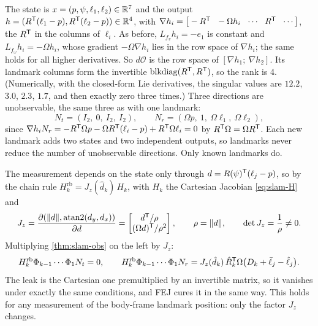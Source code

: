 \begin{solutions}
  \item The state is $x = (p, \psi, \ell_1, \ell_2) \in \mathbb{R}^7$ and the output $h = (R^{\mathsf{T}}(\ell_1 - p), R^{\mathsf{T}}(\ell_2 - p)) \in \mathbb{R}^4$, with
        $\nabla h_i = \big[-R\T\ \ -\Omega h_i\ \ \cdots\ \ R\T\ \ \cdots\big]$, the $R^{\mathsf{T}}$ in the columns of $\ell_i$. As before, $L_{f_v}h_i = -e_1$ is constant and $L_{f_\omega}h_i = -\Omega h_i$, whose gradient
        $-\Omega\nabla h_i$ lies in the row space of $\nabla h_i$; the same holds for all higher derivatives. So $d\mathcal{O}$ is the row space of $[\nabla h_1;\ \nabla h_2]$. Its landmark
        columns form the invertible $\operatorname{blkdiag}(R^{\mathsf{T}}, R^{\mathsf{T}})$, so the rank is 4. (Numerically, with the closed-form Lie derivatives, the singular values are $12.2$, $3.0$, $2.3$,
        $1.7$, and then exactly zero three times.) Three directions are unobservable, the same three as with one landmark:
        \[
          N_t = (I_2,\ 0,\ I_2,\ I_2), \qquad N_r = (\Omega p,\ 1,\ \Omega\ell_1,\ \Omega\ell_2),
        \]
        since $\nabla h_iN_r = -R^{\mathsf{T}}\Omega p - \Omega R^{\mathsf{T}}(\ell_i - p) + R^{\mathsf{T}}\Omega\ell_i = 0$ by $R^{\mathsf{T}}\Omega = \Omega R^{\mathsf{T}}$. Each new landmark adds two states and two independent outputs, so landmarks never reduce
        the number of unobservable directions. Only known landmarks do.

  \item The measurement depends on the state only through $d = R(\psi)^{\mathsf{T}}(\ell_j - p)$, so by the chain rule $H_k^{\mathrm{rb}} = J_z(\hat d_k)\,H_k$, with $H_k$ the Cartesian Jacobian
        \eqref{eq:slam-H} and
        \[
          J_z = \frac{\partial(\|d\|, \operatorname{atan2}(d_y, d_x))}{\partial d} = \begin{bmatrix} d^{\mathsf{T}}/\rho \\ (\Omega d)^{\mathsf{T}}/\rho^2 \end{bmatrix}, \qquad \rho = \|d\|, \qquad \det J_z = \frac1\rho \ne 0 .
        \]
        Multiplying \cref{thm:slam-obs} on the left by $J_z$:
        \[
          H_k^{\mathrm{rb}}\Phi_{k-1}\cdots\Phi_1N_t = 0, \qquad
          H_k^{\mathrm{rb}}\Phi_{k-1}\cdots\Phi_1N_r = J_z(\hat d_k)\,\hat R_k^{\mathsf{T}}\Omega\big(D_k + \bar\ell_j - \hat\ell_j\big).
        \]
        The leak is the Cartesian one premultiplied by an invertible matrix, so it vanishes under exactly the same conditions, and FEJ cures it in the same way. This
        holds for any measurement of the body-frame landmark position: only the factor $J_z$ changes.


\end{solutions}
